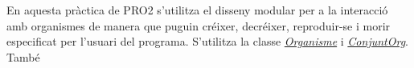 En aquesta pràctica de P\-R\-O2 s'utilitza el disseny modular per a la interacció amb organismes de manera que puguin créixer, decréixer, reproduir-\/se i morir especificat per l'usuari del programa. S'utilitza la classe {\itshape \hyperlink{class_organisme}{Organisme}} i {\itshape \hyperlink{class_conjunt_org}{Conjunt\-Org}}. També 